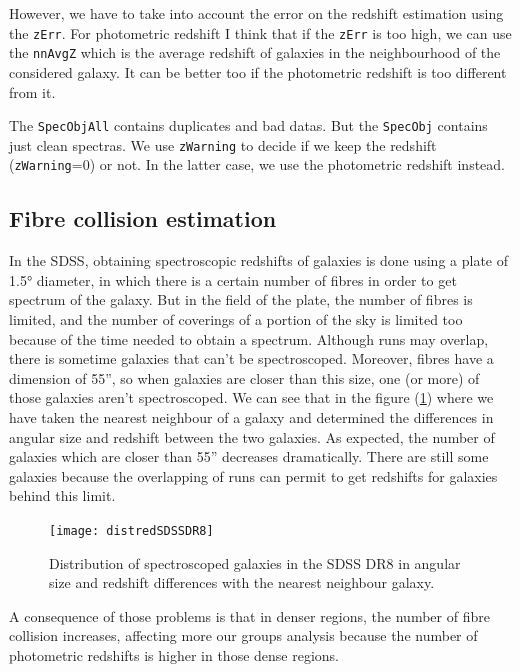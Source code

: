 However, we have to take into account the error on the redshift estimation
using the \texttt{zErr}. For photometric redshift I think that if the
\texttt{zErr} is too high, we can use the \texttt{nnAvgZ} which is the average
redshift of galaxies in the neighbourhood of the considered galaxy. It can be
better too if the photometric redshift is too different from it.

The \texttt{SpecObjAll} contains duplicates and bad datas. But the
\texttt{SpecObj} contains just clean spectras. We use \texttt{zWarning} to
decide if we keep the redshift (\texttt{zWarning}=0) or not. In the latter
case, we use the photometric redshift instead.
%
\subsection{Fibre collision estimation}
%
In the SDSS, obtaining spectroscopic redshifts of galaxies is done using a
plate of 1.5° diameter, in which there is a certain number of fibres in
order to get spectrum of the galaxy. But in the field of the plate, the number
of fibres is limited, and the number of coverings of a portion of the sky is
limited too because of the time needed to obtain a spectrum. Although runs may
overlap, there is sometime galaxies that can't be spectroscoped. Moreover,
fibres have a dimension of 55'', so when galaxies are closer than this
size, one (or more) of those galaxies aren't spectroscoped. We can see that in
the figure (\ref{fig:angreddist}) where we have taken the nearest neighbour of a
galaxy and determined the differences in angular size and redshift between the
two galaxies. As expected, the number of galaxies which are closer than
55'' decreases dramatically. There are still some galaxies because the
overlapping of runs can permit to get redshifts for galaxies behind this limit.
\begin{figure}[ht]
    \centering
    \texttt{[image: distredSDSSDR8]}
    \caption{\footnotesize{}Distribution of spectroscoped galaxies in the SDSS DR8 in angular size and redshift differences with
    the nearest neighbour galaxy.}
\label{fig:angreddist}
\end{figure}

A consequence of those problems is that in denser regions, the number of fibre
collision increases, affecting more our groups analysis because the number of
photometric redshifts is higher in those dense regions.

